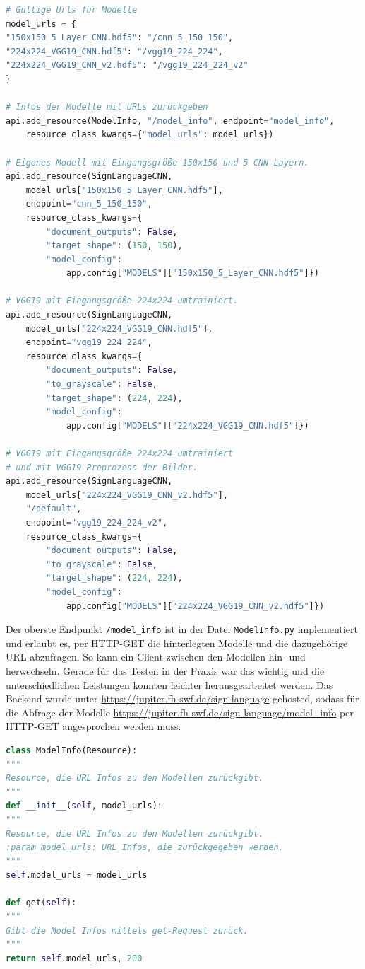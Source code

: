 \documentclass[11pt,bibliography=totocnumbered]{scrartcl}
\begin{document}
\begin{lstlisting}[language=python,firstnumber=6,caption={Anlegen der HTTP-Endpunkte.},label=lst:add_http_endpoints]
# Gültige Urls für Modelle
model_urls = {
"150x150_5_Layer_CNN.hdf5": "/cnn_5_150_150",
"224x224_VGG19_CNN.hdf5": "/vgg19_224_224",
"224x224_VGG19_CNN_v2.hdf5": "/vgg19_224_224_v2"
}

# Infos der Modelle mit URLs zurückgeben
api.add_resource(ModelInfo, "/model_info", endpoint="model_info", 
	resource_class_kwargs={"model_urls": model_urls})

# Eigenes Modell mit Eingangsgröße 150x150 und 5 CNN Layern.
api.add_resource(SignLanguageCNN, 
	model_urls["150x150_5_Layer_CNN.hdf5"], 
	endpoint="cnn_5_150_150",
	resource_class_kwargs={
		"document_outputs": False,
		"target_shape": (150, 150),
		"model_config": 
			app.config["MODELS"]["150x150_5_Layer_CNN.hdf5"]})

# VGG19 mit Eingangsgröße 224x224 umtrainiert.
api.add_resource(SignLanguageCNN, 
	model_urls["224x224_VGG19_CNN.hdf5"], 
	endpoint="vgg19_224_224",
	resource_class_kwargs={
		"document_outputs": False,
		"to_grayscale": False,
		"target_shape": (224, 224),
		"model_config": 
			app.config["MODELS"]["224x224_VGG19_CNN.hdf5"]})

# VGG19 mit Eingangsgröße 224x224 umtrainiert 
# und mit VGG19_Preprozess der Bilder.
api.add_resource(SignLanguageCNN, 
	model_urls["224x224_VGG19_CNN_v2.hdf5"], 
	"/default", 
	endpoint="vgg19_224_224_v2",
	resource_class_kwargs={
		"document_outputs": False,
		"to_grayscale": False,
		"target_shape": (224, 224),
		"model_config": 
			app.config["MODELS"]["224x224_VGG19_CNN_v2.hdf5"]})
\end{lstlisting}
Der oberste Endpunkt \lstinline[language=pythoninline]|/model_info| ist in der Datei \lstinline[language=pythoninline]|ModelInfo.py| implementiert und erlaubt es, per HTTP-GET die hinterlegten Modelle und die dazugehörige URL abzufragen. So kann ein Client zwischen den Modellen hin- und herwechseln. Gerade für das Testen in der Praxis war das wichtig und die unterschiedlichen Leistungen konnten leichter herausgearbeitet werden. Das Backend wurde unter \url{https://jupiter.fh-swf.de/sign-language} gehosted, sodass für die Abfrage der Modelle \url{https://jupiter.fh-swf.de/sign-language/model_info} per HTTP-GET angesprochen werden muss.
\begin{lstlisting}[language=python,firstnumber=4,caption={Abfrage der möglichen Modelle.},label=lst:request_models]
class ModelInfo(Resource):
"""
Resource, die URL Infos zu den Modellen zurückgibt.
"""
def __init__(self, model_urls):
"""
Resource, die URL Infos zu den Modellen zurückgibt.
:param model_urls: URL Infos, die zurückgegeben werden.
"""
self.model_urls = model_urls

def get(self):
"""
Gibt die Model Infos mittels get-Request zurück.
"""
return self.model_urls, 200
\end{lstlisting}
\end{document}
